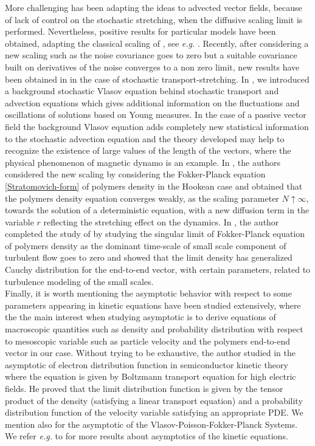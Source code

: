\documentclass[a4paper,12pt, reqno]{amsart}
\begin{document}
More challenging has been adapting the ideas to advected vector fields, because of lack of control on the stochastic stretching, when the diffusive scaling limit is performed. Nevertheless, positive results for particular models have been obtained, adapting the classical scaling of \cite{Galeati}, see  \textit{e.g.} \cite{ButFlaLuo, butori_meanfield_2025, butori3DHNSE, FL1,FlandoliLuo2024,Papini}. Recently, after considering a new scaling such as   the noise covariance goes to zero but a suitable covariance built on derivatives of the noise converges to a non zero limit, new results have been obtained in \cite{BFLT2024,Flandoli-Tahraoui} in the case of   stochastic transport-stretching. In \cite{BFLT2024}, we  introduced a background stochastic Vlasov equation behind stochastic transport and advection equations which gives additional information on the fluctuations and oscillations of solutions  based on Young measures.  In the case of a passive vector field the background Vlasov equation adds completely new statistical information to the stochastic advection equation and  the theory developed may help to recognize the existence of large values of the length of the vectors, where   the physical phenomenon of magnetic dynamo is an example. In \cite{Flandoli-Tahraoui}, the authors considered the new scaling by considering the Fokker-Planck equation \eqref{Stratomovich-form} of polymers density in the Hookean case and obtained that the polymers density equation  converges weakly, as the scaling parameter $N\uparrow \infty,$ towards the solution of a deterministic equation, with a new diffusion term in the variable $r$ reflecting the stretching effect on the dynamics. In \cite{tahraoui2025small}, the  author completed the study of \cite{Flandoli-Tahraoui} by studying  the singular limit of  Fokker-Planck equation of   polymers density as the dominant time-scale of small scale component of turbulent flow goes to zero and showed that the limit density has  generalized Cauchy distribution  for the end-to-end vector, with  certain parameters, related to turbulence modeling of the small scales.  \\
 

Finally, it is worth mentioning the asymptotic behavior with respect to some parameters appearing in kinetic equations have been studied extensively, where the the main interest when studying asymptotic is to derive equations of macroscopic quantities such as density and probability distribution with respect to mesoscopic variable such as particle velocity and the polymers end-to-end vector in our case. Without trying to be exhaustive,  the author studied  in \cite{Poupaud1992} the  asymptotic of electron distribution function in semiconductor kinetic theory where the equation is  given by Boltzmann transport equation for high electric fields. He proved that the limit  distribution function is given by the tensor product of the density (satisfying a  linear transport equation) and a probability distribution function of the velocity variable  satisfying an  appropriate PDE. 
We mention also   \cite{Masmoudi-Vlasov,Nieto2001high} for  the  asymptotic of the  Vlasov-Poisson-Fokker-Planck Systems. We refer \textit{e.g.} to \cite{goudon2005,jabin2000,Poupaud2000} for more results about   asymptotics of the kinetic equations.\\
\end{document}
